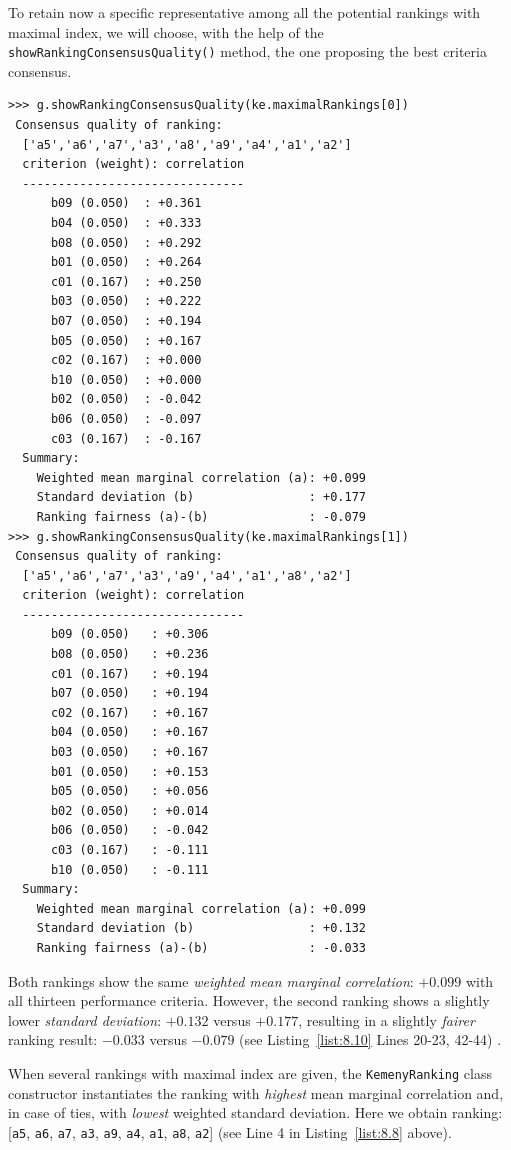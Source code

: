 To retain now a specific representative among all the potential rankings with maximal \Kemeny index, we will choose, with the help of the \texttt{showRankingCon\-sensusQuality()} method, the one proposing the best criteria consensus.
\begin{lstlisting}[caption={Computing the consensus quality of a ranking},label=list:8.10]   
>>> g.showRankingConsensusQuality(ke.maximalRankings[0])
 Consensus quality of ranking:
  ['a5','a6','a7','a3','a8','a9','a4','a1','a2']
  criterion (weight): correlation
  -------------------------------
      b09 (0.050)  : +0.361
      b04 (0.050)  : +0.333
      b08 (0.050)  : +0.292
      b01 (0.050)  : +0.264
      c01 (0.167)  : +0.250
      b03 (0.050)  : +0.222
      b07 (0.050)  : +0.194
      b05 (0.050)  : +0.167
      c02 (0.167)  : +0.000
      b10 (0.050)  : +0.000
      b02 (0.050)  : -0.042
      b06 (0.050)  : -0.097
      c03 (0.167)  : -0.167
  Summary:
    Weighted mean marginal correlation (a): +0.099
    Standard deviation (b)                : +0.177
    Ranking fairness (a)-(b)              : -0.079
>>> g.showRankingConsensusQuality(ke.maximalRankings[1])
 Consensus quality of ranking:
  ['a5','a6','a7','a3','a9','a4','a1','a8','a2']
  criterion (weight): correlation
  -------------------------------
      b09 (0.050)   : +0.306
      b08 (0.050)   : +0.236
      c01 (0.167)   : +0.194
      b07 (0.050)   : +0.194
      c02 (0.167)   : +0.167
      b04 (0.050)   : +0.167
      b03 (0.050)   : +0.167
      b01 (0.050)   : +0.153
      b05 (0.050)   : +0.056
      b02 (0.050)   : +0.014
      b06 (0.050)   : -0.042
      c03 (0.167)   : -0.111
      b10 (0.050)   : -0.111
  Summary:
    Weighted mean marginal correlation (a): +0.099
    Standard deviation (b)                : +0.132
    Ranking fairness (a)-(b)              : -0.033
\end{lstlisting}

Both \Kemeny rankings show the same \emph{weighted mean marginal correlation}: $+0.099$ with all thirteen performance criteria. However, the second ranking shows a slightly lower \emph{standard deviation}: $+0.132$ versus $+0.177$, resulting in a slightly \emph{fairer} ranking result: $-0.033$ versus $-0.079$ (see Listing~\vref{list:8.10} Lines 20-23, 42-44) .

When several rankings with maximal \Kemeny index are given, the \texttt{Kemeny\-Ranking} class constructor instantiates the ranking with \emph{highest} mean marginal correlation and, in case of ties, with \emph{lowest} weighted standard deviation. Here we obtain ranking: [\texttt{a5}, \texttt{a6}, \texttt{a7}, \texttt{a3}, \texttt{a9}, \texttt{a4}, \texttt{a1}, \texttt{a8}, \texttt{a2}] (see Line 4 in Listing~\vref{list:8.8} above).

